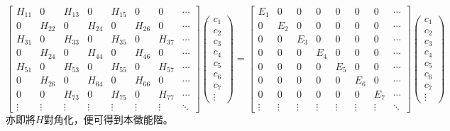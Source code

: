 \documentclass[12pt]{article}
\begin{document}
{\footnotesize
\begin{equation}
    \begin{bmatrix}
        H_{11} & 0 & H_{13} & 0 & H_{15} & 0 & 0 & \cdots \\
        0 & H_{22} & 0 & H_{24} & 0 & H_{26} & 0 & \cdots \\
        H_{31} & 0 & H_{33} & 0 & H_{35} & 0 & H_{37} & \cdots \\
        0 & H_{24} & 0 & H_{44} & 0 & H_{46} & 0 & \cdots \\
        H_{51} & 0 & H_{53} & 0 & H_{55} & 0 & H_{57} & \cdots \\
        0 & H_{26} & 0 & H_{64} & 0 & H_{66} & 0 & \cdots \\
        0 & 0 & H_{73} & 0 & H_{75} & 0 & H_{77} & \cdots \\
        \vdots & \vdots & \vdots & \vdots & \vdots & \vdots & \vdots & \ddots
    \end{bmatrix}
    \begin{pmatrix}
        c_1 \\ c_2 \\ c_3 \\ c_4 \\ c_5 \\ c_6 \\ c_7 \\ \vdots
    \end{pmatrix}
    =
    \begin{bmatrix}
        E_1 & 0 & 0 & 0 & 0 & 0 & 0 & \cdots \\
        0 & E_2 & 0 & 0 & 0 & 0 & 0 & \cdots \\
        0 & 0 & E_3 & 0 & 0 & 0 & 0 & \cdots \\
        0 & 0 & 0 & E_4 & 0 & 0 & 0 & \cdots \\
        0 & 0 & 0 & 0 & E_5 & 0 & 0 & \cdots \\
        0 & 0 & 0 & 0 & 0 & E_6 & 0 & \cdots \\
        0 & 0 & 0 & 0 & 0 & 0 & E_7 & \cdots \\
        \vdots & \vdots & \vdots & \vdots & \vdots & \vdots & \vdots & \ddots
    \end{bmatrix}
    \begin{pmatrix}
        c_1 \\ c_2 \\ c_3 \\ c_4 \\ c_5 \\ c_6 \\ c_7 \\ \vdots
    \end{pmatrix}
\end{equation}
}
亦即將$H$對角化，便可得到本徵能階。
\end{document}
